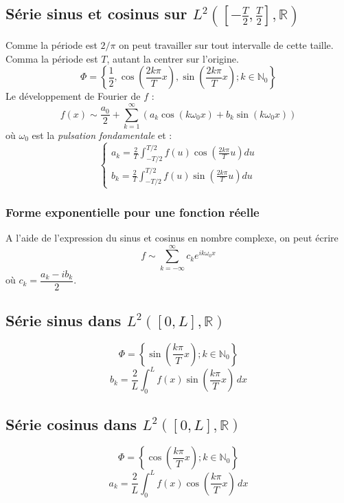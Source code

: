 \documentclass	[11pt, a4paper, openany]{book}
\newcommand{\serie}{\sum_{k=1}^\infty}
\begin{document}
\subsection{Série sinus et cosinus sur $L^2([-\frac{T}{2}, \frac{T}{2}], \mathbb{R})$}
Comme la période est $2/\pi$ on peut travailler sur tout  intervalle de cette taille. Comma la période est $T$, autant la centrer sur l'origine.
\begin{equation}
\Phi = \left\{ \frac{1}{2}, \cos\left(\frac{2k\pi}{T}x\right), \sin\left(\frac{2k\pi}{T}x\right) ; k \in \mathbb{N}_0\right\}
\end{equation}
Le développement de Fourier de $f$ :
\begin{equation}
f(x) \sim \frac{a_0}{2} + \serie (a_k\cos(k\omega_0x) + b_k\sin(k\omega_0x))
\end{equation}
où $\omega_0$ est la \textit{pulsation fondamentale} et :
\begin{equation}
\left\{\begin{array}{l}
a_k = \frac{2}{T}\int_{-T/2}^{T/2} f(u)\cos\left(\frac{2k\pi}{T}u\right)du\\
b_k = \frac{2}{T}\int_{-T/2}^{T/2} f(u)\sin\left(\frac{2k\pi}{T}u\right)du
\end{array}\right.
\end{equation}

\subsubsection{Forme exponentielle pour une fonction réelle}
A l'aide de l'expression du sinus et cosinus en nombre complexe, on peut écrire 
\begin{equation}
f \sim \sum_{k=-\infty}^\infty c_ke^{ik\omega_0x}
\end{equation}
où $c_k = \dfrac{a_k - ib_k}{2}$.

\subsection{Série sinus dans $L^2([0, L], \mathbb{R})$} 
\begin{equation}
\Phi = \left\{\sin\left(\frac{k\pi}{T}x\right) ; k \in \mathbb{N}_0\right\}
\end{equation}
\begin{equation}
b_k=\frac{2}{L}\int_0^Lf(x)\sin\left(\frac{k\pi}{T}x\right)\,dx
\end{equation}
\subsection{Série cosinus dans $L^2([0, L], \mathbb{R})$} 
\begin{equation}
\Phi = \left\{\cos\left(\frac{k\pi}{T}x\right) ; k \in \mathbb{N}_0\right\}
\end{equation}
\begin{equation}
a_k=\frac{2}{L}\int_0^Lf(x)\cos\left(\frac{k\pi}{T}x\right)\,dx
\end{equation}
\end{document}
